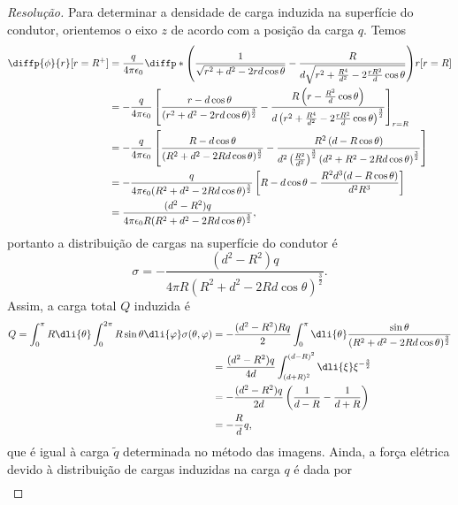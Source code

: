 \begin{proof}[Resolução]
    Para determinar a densidade de carga induzida na superfície do condutor, orientemos o eixo \(z\) de acordo com a posição da carga \(q\). Temos
    \begin{align*}
        \diffp{\phi}{r}[r=R^+] &= \frac{q}{4\pi \epsilon_0} \diffp*{\left(\frac{1}{\sqrt{r^2 + d^2 - 2rd \cos\theta}} - \frac{R}{d\sqrt{r^2 + \frac{R^4}{d^2} - 2 \frac{rR^2}{d}\cos\theta}}\right)}{r}[r=R]\\
                               &= -\frac{q}{4\pi \epsilon_0} \left[\frac{r - d\cos\theta}{(r^2 + d^2 - 2rd\cos\theta)^{\frac32}} - \frac{R\left(r - \frac{R^2}{d}\cos\theta\right)}{d\left(r^2 + \frac{R^4}{d^2} - 2\frac{rR^2}{d}\cos\theta\right)^{\frac32}}\right]_{r=R}\\
                               &= -\frac{q}{4\pi \epsilon_0} \left[\frac{R - d\cos\theta}{(R^2 + d^2 - 2Rd\cos\theta)^{\frac32}} - \frac{R^2\left(d - R\cos\theta\right)}{d^2\left(\frac{R^2}{d^2}\right)^{\frac32}\left(d^2 + R^2 - 2Rd\cos\theta\right)^{\frac32}}\right]\\
                               &= -\frac{q}{4\pi \epsilon_0 (R^2 + d^2 - 2Rd \cos\theta)^{\frac32}}\left[R - d \cos\theta - \frac{R^2d^3(d - R\cos\theta)}{d^2R^3}\right]\\
                               &= \frac{(d^2 - R^2)q}{4\pi \epsilon_0 R(R^2 + d^2 - 2Rd \cos\theta)^{\frac32}},
    \end{align*}
    portanto a distribuição de cargas na superfície do condutor é
    \begin{equation*}
        \sigma = -\frac{(d^2 - R^2)q}{4\pi R(R^2 + d^2 - 2Rd \cos\theta)^{\frac32}}.
    \end{equation*}
    Assim, a carga total \(Q\) induzida é
    \begin{align*}
        Q = \int_0^\pi R\dli{\theta} \int_0^{2\pi} R\sin\theta \dli{\varphi} \sigma(\theta, \varphi)
        &= -\frac{(d^2 - R^2)Rq}{2}\int_0^\pi \dli{\theta} \frac{\sin\theta}{(R^2 + d^2 - 2Rd\cos\theta)^{\frac32}}\\
        &= \frac{(d^2 - R^2)q}{4d}\int_{(d + R)^2}^{(d - R)^2} \dli{\xi} \xi^{-\frac32}\\
        &= -\frac{(d^2 - R^2)q}{2d} \left(\frac{1}{d - R} - \frac{1}{d + R}\right)\\
        &= -\frac{R}{d}q,
    \end{align*}
    que é igual à carga \(\tilde{q}\) determinada no método das imagens. Ainda, a força elétrica devido à distribuição de cargas induzidas na carga \(q\) é dada por
    \begin{align*}

\end{align*}
\end{proof}
